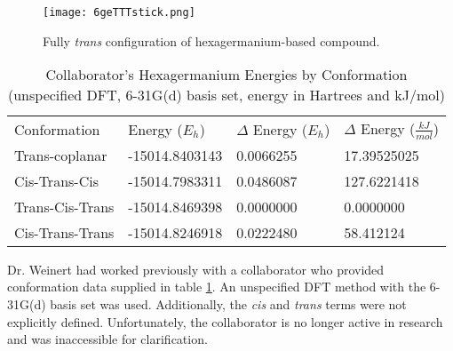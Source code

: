 \begin{figure}
	
	\centering
	
	\texttt{[image: 6geTTTstick.png]}
	
	\caption{Fully \textit{trans} configuration of hexagermanium-based compound.}
	
	\label{fig:Ge6TransAll}
	
\end{figure}
\begin{table}[]
	
	\centering
	\begin{tabular}{llll}
		Conformation & Energy ($E_{h}$)    & $\Delta$ Energy ($E_{h}$) & $\Delta$ Energy ($\frac{kJ}{mol}$) \\ \cline{1-4} 
		Trans-coplanar        & -15014.8403143 & 0.0066255            & 17.39525025                        \\
		Cis-Trans-Cis         & -15014.7983311 & 0.0486087            & 127.6221418                        \\
		Trans-Cis-Trans       & -15014.8469398 & 0.0000000            & 0.0000000                                  \\
		Cis-Trans-Trans       & -15014.8246918 & 0.0222480            & 58.412124                         
	\end{tabular}
	\caption{Collaborator's Hexagermanium Energies by Conformation \\ (unspecified DFT, 6-31G(d) basis set, energy in Hartrees and kJ/mol)}
	
	\label{tab:Ge6CollabEnergies}
	
\end{table}
Dr. Weinert had worked previously with a collaborator who provided conformation data supplied in table \ref{tab:Ge6CollabEnergies}.
An unspecified DFT method with the 6-31G(d) basis set was used. 
Additionally, the \textit{cis} and \textit{trans} terms were not explicitly defined.
Unfortunately, the collaborator is no longer active in research and was inaccessible for clarification.

